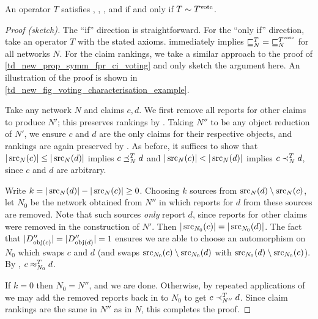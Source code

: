 \begin{theorem}
    \label{td_new_thm_voting_characterisation}
    An operator $T$ satisfies \symmetry{}, \freshposresp{},
    \classicalindependence{}, \flatsources{} and \objectirrelevance{} if and
    only if $T \sim T^{\operatorname{vote}}$.
\end{theorem}

\begin{proof}[Proof (sketch)]
    The ``if'' direction is straightforward. For the
    ``only if'' direction, take an operator $T$ with the stated axioms.
    \flatsources{} immediately implies ${\sqsubseteq_N^T} = {\sqsubseteq_N^{T^{\operatorname{vote}}}}$ for
    all networks $N$. For the claim rankings, we take a similar approach to the
    proof of \cref{td_new_prop_symm_fpr_ci_voting} and only sketch the argument
    here. An illustration of the proof is shown in
    \cref{td_new_fig_voting_characterisation_example}.

    Take any network $N$ and claims $c, d$. We first remove all reports for
    other claims to produce $N'$; this preserves rankings by
    \classicalindependence{}. Taking $N''$ to be any object reduction of $N'$,
    we ensure $c$ and $d$ are the only claims for their respective
    objects,\footnotemark{} and rankings are again preserved by
    \objectirrelevance{}. As before, it suffices to show that $|\operatorname{src}_N(c)| \le
    |\operatorname{src}_N(d)|$ implies $c \preceq_N^T d$ and $|\operatorname{src}_N(c)| < |\operatorname{src}_N(d)|$ implies
    $c \prec_N^T d$, since $c$ and $d$ are arbitrary.

    Write $k = |\operatorname{src}_N(d)| - |\operatorname{src}_N(c)| \ge 0$. Choosing $k$ sources from
    $\operatorname{src}_N(d) \setminus \operatorname{src}_N(c)$, let $N_0$ be the network obtained from
    $N''$ in which reports for $d$ from these sources are removed. Note that
    such sources \emph{only} report $d$, since reports for other claims were
    removed in the construction of $N'$. Then $|\operatorname{src}_{N_0}(c)| =
    |\operatorname{src}_{N_0}(d)|$. The fact that $|D''_{\operatorname{obj}(c)}| = |D''_{\operatorname{obj}(d)}| = 1$
    ensures we are able to choose an automorphism on $N_0$ which swaps $c$ and
    $d$ (and swaps $\operatorname{src}_{N_0}(c) \setminus \operatorname{src}_{N_0}(d)$ with $\operatorname{src}_{N_0}(d)
    \setminus \operatorname{src}_{N_0}(c)$). By \symmetry{}, $c \approx_{N_0}^T d$.

    If $k = 0$ then $N_0 = N''$, and we are done. Otherwise, by repeated
    applications of \freshposresp{} we may add the removed reports back in to
    $N_0$ to get $c \prec_{N''}^T d$. Since claim rankings are the same in $N''$
    as in $N$, this completes the proof.
\end{proof}

